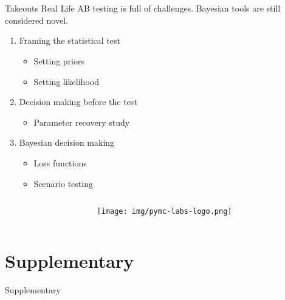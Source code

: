 \documentclass{beamer}
\begin{document}
\section{}
\begin{frame}{Takeouts}
Real Life AB testing is full of challenges. Bayesian tools are still considered novel.
    \begin{enumerate}
        \item Framing the statistical test
        \begin{itemize}
            \item Setting priors
            \item Setting likelihood
        \end{itemize}
        \item Decision making before the test
        \begin{itemize}
            \item Parameter recovery study
        \end{itemize}
        \item Bayesian decision making
        \begin{itemize}
            \item Loss functions
            \item Scenario testing
        \end{itemize}
    \end{enumerate}
\begin{columns}
    \begin{column}{0.5\linewidth}
        
    \end{column}
    \begin{column}{0.5\linewidth}
    \begin{figure}
        \centering
        \texttt{[image: img/pymc-labs-logo.png]}
    \end{figure}    
    \end{column}
\end{columns}
    
\end{frame}
\section{Supplementary}
\begin{frame}{}
    \centering \Huge Supplementary
\end{frame}
\end{document}
